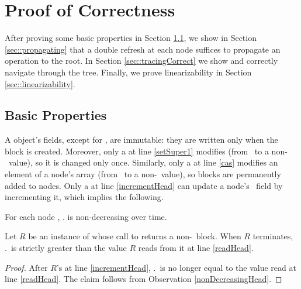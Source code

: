 
\section{Proof of Correctness}
\label{sec::correctness}

After proving some basic properties in Section \ref{sec::basicProperties},
we show in Section \ref{sec::propagating} that a double refresh at each node
suffices to propagate an operation to the root.
In Section \ref{sec::tracingCorrect} we show  and 
correctly navigate through the  tree.
Finally, we prove linearizability in Section \ref{sec::linearizability}.

\subsection{Basic Properties}
\label{sec::basicProperties}

A  object's fields, except for , are immutable:  they are written only 
when the block is created.
Moreover, only a  at line \ref{setSuper1}  modifies    
(from \nl\ to a non-\nl\ value), so it is changed only once.
Similarly, only a  at line \ref{cas} modifies an element of a node's  array 
(from \nl\ to a non-\nl\ value), so blocks are permanently added to nodes.
Only a  at line \ref{incrementHead} can update a node's \head\ field by incrementing it,
which implies the following.

\begin{observation} \label{nonDecreasingHead}
For each node ,  . is non-decreasing over time.
\end{observation}

\begin{observation} \label{obs::headInc}
Let $R$ be an instance of  whose call to  returns a non-\nl\ block.  When $R$ terminates, .\head\ is strictly greater than the value $R$ reads from it at line \ref{readHead}.
\end{observation}
\begin{proof}
After $R$'s  at line \ref{incrementHead}, .\head\ is no longer equal to the value 
read at line \ref{readHead}.  The claim follows from Observation \ref{nonDecreasingHead}.
\end{proof}

